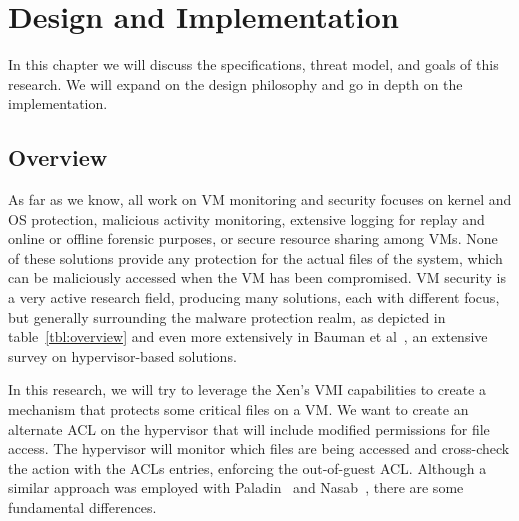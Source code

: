 
\chapter{Design and Implementation}\label{ch:chapter3}

In this chapter we will discuss the specifications, threat model, and goals of this research. We will expand on the design philosophy and go in depth on the implementation.

\section{Overview}

As far as we know, all work on \ac{VM} monitoring and security focuses on kernel and \ac{OS} protection, malicious activity monitoring, extensive logging for replay and online or offline forensic purposes, or secure resource sharing among \ac{VM}s. None of these solutions provide any protection for the actual files of the system, which can be maliciously accessed when the \ac{VM} has been compromised. \ac{VM} security is a very active research field, producing many solutions, each with different focus, but generally surrounding the malware protection realm, as depicted in table~\ref{tbl:overview} and even more extensively in Bauman et al~\cite{bauman2015survey}, an extensive survey on hypervisor-based solutions.

\par In this research, we will try to leverage the Xen’s \ac{VMI} capabilities to create a mechanism that protects some critical files on a \ac{VM}. We want to create an alternate \ac{ACL} on the hypervisor that will include modified permissions for file access. The hypervisor will monitor which files are being accessed and cross-check the action with the \ac{ACL}s entries, enforcing the out-of-guest \ac{ACL}. Although a similar approach was employed with Paladin~\cite{baliga2008automated} and Nasab~\cite{nasab2012security}, there are some fundamental differences. 

